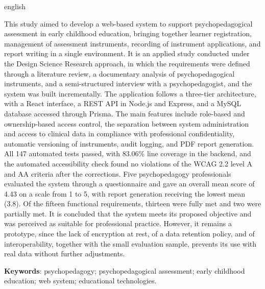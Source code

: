 \begin{resumo}[Abstract]
\begin{otherlanguage*}{english}

This study aimed to develop a web-based system to support psychopedagogical assessment in early childhood education, bringing together learner registration, management of assessment instruments, recording of instrument applications, and report writing in a single environment. It is an applied study conducted under the Design Science Research approach, in which the requirements were defined through a literature review, a documentary analysis of psychopedagogical instruments, and a semi-structured interview with a psychopedagogist, and the system was built incrementally. The application follows a three-tier architecture, with a React interface, a REST API in Node.js and Express, and a MySQL database accessed through Prisma. The main features include role-based and ownership-based access control, the separation between system administration and access to clinical data in compliance with professional confidentiality, automatic versioning of instruments, audit logging, and PDF report generation. All 147 automated tests passed, with 83.06\% line coverage in the backend, and the automated accessibility check found no violations of the WCAG 2.2 level A and AA criteria after the corrections. Five psychopedagogy professionals evaluated the system through a questionnaire and gave an overall mean score of 4.43 on a scale from 1 to 5, with report generation receiving the lowest mean (3.8). Of the fifteen functional requirements, thirteen were fully met and two were partially met. It is concluded that the system meets its proposed objective and was perceived as suitable for professional practice. However, it remains a prototype, since the lack of encryption at rest, of a data retention policy, and of interoperability, together with the small evaluation sample, prevents its use with real data without further adjustments.

\vspace{\onelineskip}

\noindent
\textbf{Keywords}: psychopedagogy; psychopedagogical assessment; early childhood education; web system; educational technologies.

\end{otherlanguage*}
\end{resumo}